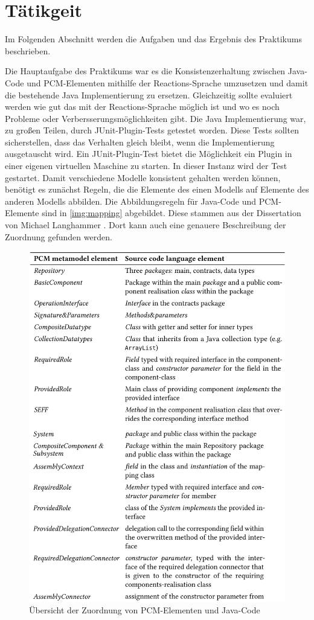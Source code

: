 \documentclass[ngerman,runningheads]{llncs}
\begin{document}
\section{Tätikgeit}
\label{sec:tätigkeit}
Im Folgenden Abschnitt werden die Aufgaben und das Ergebnis des Praktikums beschrieben. \par
Die Hauptaufgabe des Praktikums war es die Konsistenzerhaltung zwischen Java-Code und PCM-Elementen mithilfe der Reactions-Sprache umzusetzen und damit die bestehende Java Implementierung zu ersetzen. Gleichzeitig sollte evaluiert werden wie gut das mit der Reactions-Sprache möglich ist und wo es noch Probleme oder Verbersserungsmöglichkeiten gibt. Die Java Implementierung war, zu großen Teilen, durch JUnit-Plugin-Tests getestet worden. Diese Tests sollten sicherstellen, dass das Verhalten gleich bleibt, wenn die Implementierung ausgetauscht wird. Ein JUnit-Plugin-Test bietet die Möglichkeit ein Plugin in einer eigenen virtuellen Maschine zu starten. In dieser Instanz wird der Test gestartet. Damit verschiedene Modelle konsistent gehalten werden können, benötigt es zunächst Regeln, die die Elemente des einen Modells auf Elemente des anderen Modells abbilden. Die Abbildungsregeln für Java-Code und PCM-Elemente sind in \autoref{img:mapping} abgebildet. Diese stammen aus der Dissertation von Michael Langhammer \cite{langhammer}. Dort kann auch eine genauere Beschreibung der Zuordnung gefunden werden.
\begin{figure}[htp]
	\centering
  	\includegraphics[width=1\textwidth]{images/mapping.png}
	\caption{Übersicht der Zuordnung von PCM-Elementen und Java-Code}
	\label{img:mapping}
\end{figure} 
\end{document}
